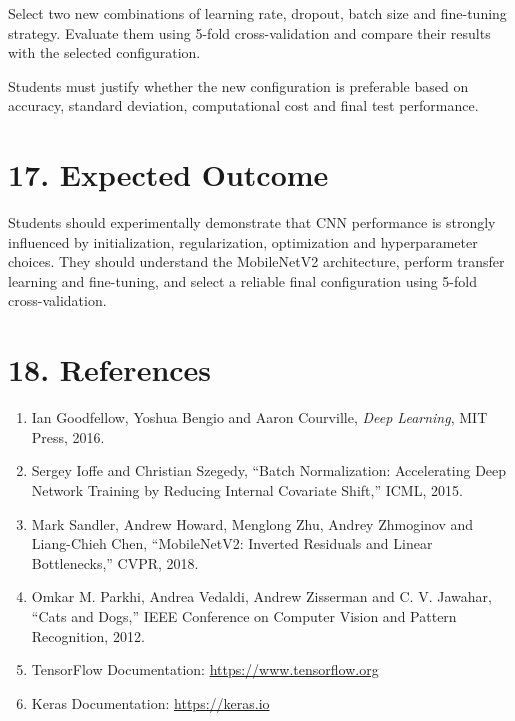 \documentclass[10pt]{article}
\begin{document}
Select two new combinations of learning rate, dropout, batch size and
fine-tuning strategy. Evaluate them using 5-fold cross-validation and
compare their results with the selected configuration.

Students must justify whether the new configuration is preferable based
on accuracy, standard deviation, computational cost and final test
performance.

\section*{17. Expected Outcome}

Students should experimentally demonstrate that CNN performance is
strongly influenced by initialization, regularization, optimization and
hyperparameter choices. They should understand the MobileNetV2 architecture,
perform transfer learning and fine-tuning, and select a reliable final
configuration using 5-fold cross-validation.

\section*{18. References}

\begin{enumerate}
\item Ian Goodfellow, Yoshua Bengio and Aaron Courville,
\emph{Deep Learning}, MIT Press, 2016.

\item Sergey Ioffe and Christian Szegedy,
``Batch Normalization: Accelerating Deep Network Training by Reducing
Internal Covariate Shift,'' ICML, 2015.

\item Mark Sandler, Andrew Howard, Menglong Zhu, Andrey Zhmoginov and
Liang-Chieh Chen, ``MobileNetV2: Inverted Residuals and Linear
Bottlenecks,'' CVPR, 2018.

\item Omkar M. Parkhi, Andrea Vedaldi, Andrew Zisserman and C. V. Jawahar,
``Cats and Dogs,'' IEEE Conference on Computer Vision and Pattern
Recognition, 2012.

\item TensorFlow Documentation:
\url{https://www.tensorflow.org}

\item Keras Documentation:
\url{https://keras.io}
\end{enumerate}
\end{document}

